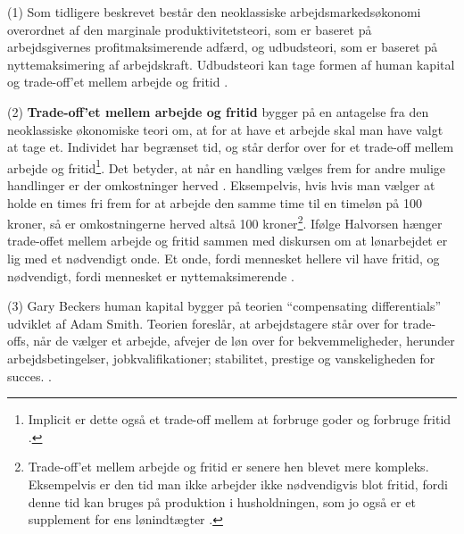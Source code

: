 (1) Som tidligere beskrevet består den neoklassiske arbejdsmarkedsøkonomi overordnet af den marginale produktivitetsteori, som er baseret på arbejdsgivernes profitmaksimerende adfærd, og udbudsteori, som er baseret på nyttemaksimering af arbejdskraft. Udbudsteori kan tage formen af human kapital og trade-off'et mellem arbejde og fritid \parencite[1216]{Cain1976}.

(2) \textbf{Trade-off'et mellem arbejde og fritid} bygger på en antagelse fra den neoklassiske økonomiske teori om, at for at have et arbejde skal man have valgt at tage et. Individet har begrænset tid, og står derfor over for et trade-off mellem arbejde og fritid\footnote{Implicit er dette også et trade-off mellem at forbruge goder og forbruge fritid \parencite[5]{Cahuc2004}.}. Det betyder, at når en handling vælges frem for andre mulige handlinger er der omkostninger herved \parencite[389]{Mankiw2011}. Eksempelvis, hvis hvis man vælger at holde en times fri frem for at arbejde den samme time til en timeløn på 100 kroner, så er omkostningerne herved altså 100 kroner\footnote{Trade-off'et mellem arbejde og fritid er senere hen blevet mere kompleks. Eksempelvis er den tid man ikke arbejder ikke nødvendigvis blot fritid, fordi denne tid kan bruges på produktion i husholdningen, som jo også er et supplement for ens lønindtægter \parencite[14]{Cahuc2004}.}. Ifølge Halvorsen hænger trade-offet mellem arbejde og fritid sammen med diskursen om at lønarbejdet er lig med et nødvendigt onde. Et onde, fordi mennesket hellere vil have fritid, og nødvendigt, fordi mennesket er nyttemaksimerende \parencite[26]{Halvorsen1999}.

(3) Gary Beckers human kapital bygger på teorien “compensating differentials” udviklet af Adam Smith. Teorien foreslår, at arbejdstagere står over for trade-offs, når de vælger et arbejde, afvejer de løn over for bekvemmeligheder, herunder arbejdsbetingelser, jobkvalifikationer; stabilitet, prestige og  vanskeligheden for succes. \parencite[1180]{Daw2012}.

